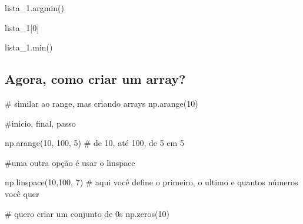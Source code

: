 \documentclass[
  letterpaper,
  DIV=11,
  numbers=noendperiod]{scrreprt}
\newenvironment{Shaded}{\begin{snugshade}}{\end{snugshade}}
\newcommand{\NormalTok}[1]{\textcolor[rgb]{0.00,0.23,0.31}{#1}}
\begin{document}
\begin{Shaded}
\begin{Highlighting}[]
\NormalTok{lista\_1.argmin()}
\end{Highlighting}
\end{Shaded}

\begin{Shaded}
\begin{Highlighting}[]
\NormalTok{lista\_1[0]}
\end{Highlighting}
\end{Shaded}

\begin{Shaded}
\begin{Highlighting}[]
\NormalTok{lista\_1.min()}
\end{Highlighting}
\end{Shaded}

\subsection{Agora, como criar um
array?}\label{agora-como-criar-um-array}

\begin{Shaded}
\begin{Highlighting}[]
\NormalTok{\# similar ao range, mas criando arrays}
\NormalTok{np.arange(10)}
\end{Highlighting}
\end{Shaded}

\begin{Shaded}
\begin{Highlighting}[]
\NormalTok{\#inicio, final, passo}

\NormalTok{np.arange(10, 100, 5) \# de 10, até 100, de 5 em 5}
\end{Highlighting}
\end{Shaded}

\begin{Shaded}
\begin{Highlighting}[]
\NormalTok{\#uma outra opção é usar o linspace}

\NormalTok{np.linspace(10,100, 7) \# aqui você define o primeiro, o ultimo e quantos números você quer}
\end{Highlighting}
\end{Shaded}

\begin{Shaded}
\begin{Highlighting}[]
\NormalTok{\# quero criar um conjunto de 0s}
\NormalTok{np.zeros(10)}
\end{Highlighting}
\end{Shaded}
\end{document}
